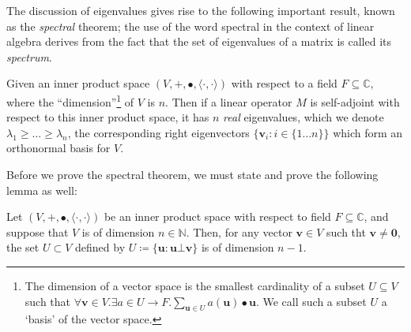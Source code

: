 	The discussion of eigenvalues gives rise to the following important result, known as the 
	\emph{spectral} theorem; the use of the word spectral in the context of linear algebra 
	derives from the fact that the set of eigenvalues of a matrix is called its 
	\emph{spectrum}.
	\begin{theorem}
		\label{theorem:spectral}
		Given an inner product space $(V, + , \bullet, \langle \cdot,\cdot\rangle)$ with 
		respect to a field $F\subseteq \mathbb{C}$, where the ``dimension''\footnote{The 
		dimension of a vector space is the smallest cardinality of a subset $U \subseteq V
		$ such that $\forall \mathbf{v} \in V . \exists a \in U \rightarrow F . \sum_{
		\mathbf{u}\in U} a(\mathbf{u})\bullet\mathbf{u}$. We call such a subset $U$ a `basis'
		of the vector space.} of $V$ is $n$. Then if a linear operator $M$ is self-adjoint 
		with respect to this inner product space, it has $n$ \emph{real} eigenvalues, 
		which we denote $\lambda_1 \geq \hdots \geq \lambda_n$, the corresponding right 
		eigenvectors $\{\mathbf{v}_i : i \in \{1\hdots n\}\}$ which form an orthonormal 
		basis for $V$.
	\end{theorem}
	Before we prove the spectral theorem, we must state and prove the following lemma as well:
	\begin{lemma}
		\label{lemma:spectralhelp}
		Let $(V, + , \bullet, \langle\cdot,\cdot\rangle)$ be an inner product space with 
		respect to field $F \subseteq \mathbb{C}$, and suppose that $V$ is of dimension $n 
		\in \mathbb{N}$. Then, for any vector $\mathbf{v}\in V$ such tht $\mathbf{v}\neq 
		\mathbf{0}$, the set $U\subset V$ defined by $U \coloneqq \{\mathbf{u} : \mathbf{u}
		\bot \mathbf{v}\}$ is of dimension $n-1$.
	\end{lemma}
